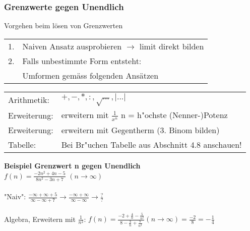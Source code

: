 \subsubsection{Grenzwerte gegen Unendlich}
    Vorgehen beim lösen von Grenzwerten \\
        \begin{tabular}{ll}
            1. & Naiven Ansatz ausprobieren $\rightarrow$ limit direkt bilden \\
            2. & Falls unbestimmte Form entsteht: \\
               & Umformen gemäss folgenden Ansätzen \\
        \end{tabular}
        
        \begin{tabular}{ll}
            Arithmetik:  & $+, -, *, :, \sqrt{...}, \vert ...\vert$ \\
            Erweiterung: & erweitern mit $\frac{1}{x^n}$ n = h"ochste (Nenner-)Potenz \\
            Erweiterung: & erweitern mit Gegentherm (3. Binom bilden)\\
            Tabelle:     & Bei Br"uchen Tabelle aus Abschnitt 4.8 anschauen! \\
        \end{tabular}

    \textbf{Beispiel Grenzwert n gegen Unendlich} \\
        $f(n) = \frac{-2n^2+4n-5}{8n^2-3n+7}$ $(n \rightarrow \infty)$ \\
        \\
        "Naiv": $\frac{-\infty + \infty + 5}{\infty - \infty + 7} \rightarrow \frac{-\infty + \infty}{\infty - \infty} \rightarrow \frac{?}{?}$ \\
        \\
        Algebra, Erweitern mit $\frac{1}{n^2}$: $f(n) = \frac{-2+\frac{4}{n}-\frac{5}{n^2}}{8-\frac{3}{n}+\frac{7}{n^2}} (n \rightarrow \infty) = \frac{-2}{8} = -\frac{1}{4}$ \\				

